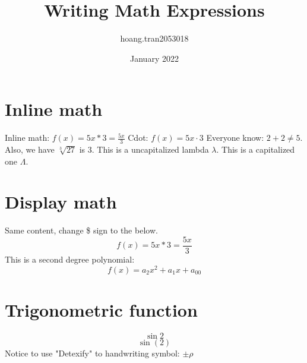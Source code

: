 \documentclass{article}
\title{Writing Math Expressions}
\author{hoang.tran2053018 }
\date{January 2022}
\begin{document}
\maketitle

\section{Inline math}
Inline math: $f(x) = 5x*3=\frac{5x}{3}$ \newline
Cdot: $f(x)=5x \cdot 3$ \newline
Everyone know: $2+2 \neq 5$. \newline
Also, we have $\sqrt[3]{27}$ is $3$. \newline
This is a uncapitalized lambda $\lambda$. This is a capitalized one $\Lambda$. 

\section{Display math}
Same content, change \$ sign to the below.
\[f(x) = 5x*3=\frac{5x}{3}\] This is a second degree polynomial: \[f(x)=a_2 x^{2} + a_1x + a_{00}\]

\section{Trigonometric function}
\[\sin{2}\]
\[\sin(2)\]
Notice to use "Detexify" to handwriting symbol: $\pm{\rho}$
\end{document}
